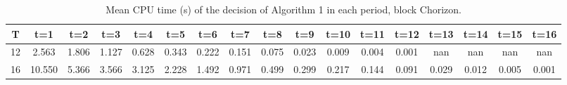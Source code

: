 \begin{table}[H]
\centering
\caption{Mean CPU time (s) of the decision of Algorithm 1 in each period, block Chorizon.}
\label{tab:test2_Q3_period}
\begin{tabular}{ccccccccccccccccc}
\toprule
T & t=1 & t=2 & t=3 & t=4 & t=5 & t=6 & t=7 & t=8 & t=9 & t=10 & t=11 & t=12 & t=13 & t=14 & t=15 & t=16 \\
\midrule
12 & 2.563 & 1.806 & 1.127 & 0.628 & 0.343 & 0.222 & 0.151 & 0.075 & 0.023 & 0.009 & 0.004 & 0.001 & nan & nan & nan & nan \\
16 & 10.550 & 5.366 & 3.566 & 3.125 & 2.228 & 1.492 & 0.971 & 0.499 & 0.299 & 0.217 & 0.144 & 0.091 & 0.029 & 0.012 & 0.005 & 0.001 \\
\bottomrule
\end{tabular}
\end{table}